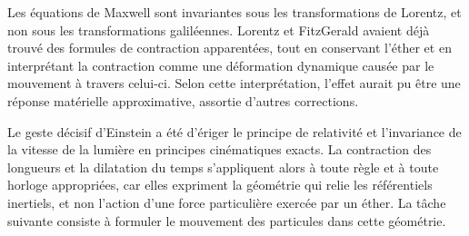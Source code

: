 \begin{classroomqa}
\end{classroomqa}

Les équations de Maxwell sont invariantes sous les transformations de Lorentz, et non sous les transformations galiléennes. Lorentz et FitzGerald avaient déjà trouvé des formules de contraction apparentées, tout en conservant l’éther et en interprétant la contraction comme une déformation dynamique causée par le mouvement à travers celui-ci. Selon cette interprétation, l’effet aurait pu être une réponse matérielle approximative, assortie d’autres corrections.

Le geste décisif d’Einstein a été d’ériger le principe de relativité et l’invariance de la vitesse de la lumière en principes cinématiques exacts. La contraction des longueurs et la dilatation du temps s’appliquent alors à toute règle et à toute horloge appropriées, car elles expriment la géométrie qui relie les référentiels inertiels, et non l’action d’une force particulière exercée par un éther. La tâche suivante consiste à formuler le mouvement des particules dans cette géométrie.
